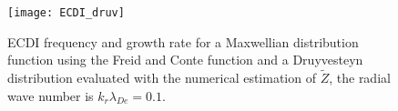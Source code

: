   \begin{figure}[!hbt]
  \centering
  \texttt{[image: ECDI\_druv]}
  \caption{\acs{ECDI} frequency and growth rate for a Maxwellian distribution function using the Freid and Conte function and a Druyvesteyn distribution evaluated with the numerical estimation of $\tilde{Z}$, the radial wave number is $k_r \lambda_{De} = 0.1 $.}
  \label{fig-ECDI_druv}
\end{figure}

\let\rightmark=\oldrightmark
